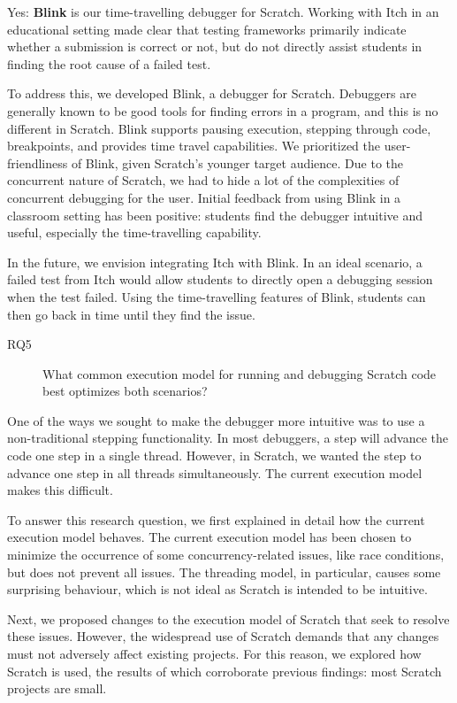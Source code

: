 \documentclass[main]{subfiles}
\begin{document}
Yes: \textbf{Blink} is our time-travelling debugger for Scratch.
Working with Itch in an educational setting made clear that testing frameworks primarily indicate whether a submission is correct or not, but do not directly assist students in finding the root cause of a failed test.

To address this, we developed Blink, a debugger for Scratch.
Debuggers are generally known to be good tools for finding errors in a program, and this is no different in Scratch.
Blink supports pausing execution, stepping through code, breakpoints, and provides time travel capabilities.
We prioritized the user-friendliness of Blink, given Scratch's younger target audience.
Due to the concurrent nature of Scratch, we had to hide a lot of the complexities of concurrent debugging for the user.
Initial feedback from using Blink in a classroom setting has been positive: students find the debugger intuitive and useful, especially the time-travelling capability.

In the future, we envision integrating Itch with Blink.
In an ideal scenario, a failed test from Itch would allow students to directly open a debugging session when the test failed.
Using the time-travelling features of Blink, students can then go back in time until they find the issue.

\begin{description}
    \item[RQ5] What common execution model for running and debugging Scratch code best optimizes both scenarios?
\end{description}

One of the ways we sought to make the debugger more intuitive was to use a non-traditional stepping functionality.
In most debuggers, a step will advance the code one step in a single thread.
However, in Scratch, we wanted the step to advance one step in all threads simultaneously.
The current execution model makes this difficult.

To answer this research question, we first explained in detail how the current execution model behaves.
The current execution model has been chosen to minimize the occurrence of some concurrency-related issues, like race conditions, but does not prevent all issues.
The threading model, in particular, causes some surprising behaviour, which is not ideal as Scratch is intended to be intuitive.

Next, we proposed changes to the execution model of Scratch that seek to resolve these issues.
However, the widespread use of Scratch demands that any changes must not adversely affect existing projects.
For this reason, we explored how Scratch is used, the results of which corroborate previous findings: most Scratch projects are small.
\end{document}
